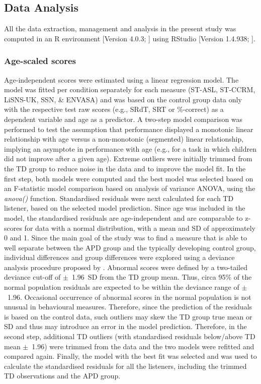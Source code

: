 \documentclass[a4paper, twoside]{templates/ociamthesis}
\begin{document}
\hypertarget{data-analysis}{%
\subsection{Data Analysis}\label{data-analysis}}

All the data extraction, management and analysis in the present study was computed in an R environment {[}Version 4.0.3; \textcite{RCore}{]} using RStudio {[}Version 1.4.938; \textcite{RStudio}{]}.\\

\hypertarget{z-scores}{%
\subsubsection{Age-scaled scores}\label{z-scores}}

Age-independent scores were estimated using a linear regression model. The model was fitted per condition separately for each measure (ST-ASL, ST-CCRM, LiSNS-UK, SSN, \& ENVASA) and was based on the control group data only with the respective test raw scores (e.g., SRdT, SRT or \%-correct) as a dependent variable and age as a predictor. A two-step model comparison was performed to test the assumption that performance displayed a monotonic linear relationship with age versus a non-monotonic (segmented) linear relationship, implying an asymptote in performance with age (e.g., for a task in which children did not improve after a given age). Extreme outliers were initially trimmed from the TD group to reduce noise in the data and to improve the model fit. In the first step, both models were computed and the best model was selected based on an F-statistic model comparison based on analysis of variance ANOVA, using the \emph{anova()} function. Standardised residuals were next calculated for each TD listener, based on the selected model prediction. Since age was included in the model, the standardised residuals are age-independent and are comparable to z-scores for data with a normal distribution, with a mean and SD of approximately 0 and 1. Since the main goal of the study was to find a measure that is able to well separate between the APD group and the typically developing control group, individual differences and group differences were explored using a deviance analysis procedure proposed by \textcite{Ramus2003}. Abnormal scores were defined by a two-tailed deviance cut-off of \(\pm\)~1.96~SD from the TD group mean. Thus, circa 95\% of the normal population residuals are expected to be within the deviance range of \(\pm\)~1.96. Occasional occurrence of abnormal scores in the normal population is not unusual in behavioural measures. Therefore, since the prediction of the residuals is based on the control data, such outliers may skew the TD group true mean or SD and thus may introduce an error in the model prediction. Therefore, in the second step, additional TD outliers (with standardised residuals below/above TD mean \(\pm\)~1.96) were trimmed from the data and the two models were refitted and compared again. Finally, the model with the best fit was selected and was used to calculate the standardised residuals for all the listeners, including the trimmed TD observations and the APD group.
\end{document}
